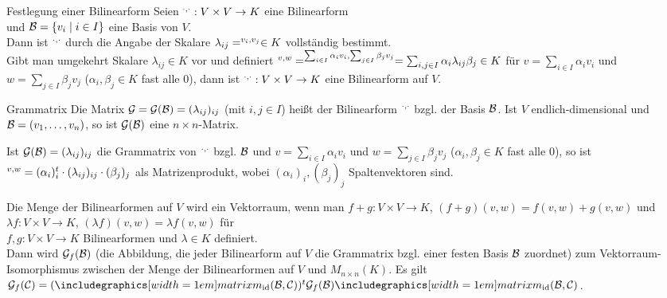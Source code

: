 \begin{Satz}{Festlegung einer Bilinearform}
    Seien $\sp{\cdot, \cdot}: V \times V \rightarrow K$ eine Bilinearform \\
    und $\mathcal{B} = \{v_i \;|\; i \in I\}$ eine Basis von $V$. \\
    Dann ist $\sp{\cdot, \cdot}$ durch die Angabe der Skalare
    $\lambda_{ij} = \sp{v_i, v_j} \in K$ vollständig bestimmt. \\
    Gibt man umgekehrt Skalare $\lambda_{ij} \in K$ vor und definiert
    $\sp{v, w} = \sp{\sum_{i \in I} \alpha_i v_i, \sum_{j \in I} \beta_j v_j}
    = \sum_{i, j \in I} \alpha_i \lambda_{ij} \beta_j \in K$
    für $v = \sum_{i \in I} \alpha_i v_i$ und
    $w = \sum_{j \in I} \beta_j v_j$ ($\alpha_i, \beta_j \in K$ fast alle $0$),
    dann ist $\sp{\cdot, \cdot}: V \times V \rightarrow K$ eine Bilinearform
    auf $V$.
\end{Satz}

\begin{Def}{Grammatrix}
    Die Matrix $\mathcal{G} = \mathcal{G}(\mathcal{B}) = (\lambda_{ij})_{ij}$
    (mit $i, j \in I$) heißt  der Bilinearform
    $\sp{\cdot, \cdot}$ bzgl. der Basis $\mathcal{B}$.
    Ist $V$ endlich-dimensional und $\mathcal{B} = (v_1, \ldots, v_n)$,
    so ist $\mathcal{G}(\mathcal{B})$ eine $n \times n$-Matrix.
\end{Def}

\begin{Bem}
    Ist $\mathcal{G}(\mathcal{B}) = (\lambda_{ij})_{ij}$ die Grammatrix
    von $\sp{\cdot, \cdot}$ bzgl. $\mathcal{B}$ und
    $v = \sum_{i \in I} \alpha_i v_i$ und $w = \sum_{j \in I} \beta_j v_j$
    ($\alpha_i, \beta_j \in K$ fast alle $0$), so ist
    $\sp{v, w} = (\alpha_i)_i^t \cdot (\lambda_{ij})_{ij} \cdot (\beta_j)_j$
    als Matrizenprodukt, wobei $(\alpha_i)_i, (\beta_j)_j$ Spaltenvektoren
    sind.
\end{Bem}

\begin{Bem}
    Die Menge der Bilinearformen auf $V$ wird ein Vektorraum, wenn
    man $f+g: V \times V \rightarrow K$, $(f+g)(v, w) = f(v, w) + g(v, w)$
    und $\lambda f: V \times V \rightarrow K$,
    $(\lambda f)(v, w) = \lambda f(v, w)$ für \\
    $f, g: V \times V \rightarrow K$
    Bilinearformen und $\lambda \in K$ definiert. \\
    Dann wird $\mathcal{G}_f(\mathcal{B})$ (die Abbildung, die jeder Bilinearform
    auf $V$ die Grammatrix bzgl. einer festen Basis $\mathcal{B}$ zuordnet)
    zum Vektorraum-Isomorphismus zwischen der Menge der Bilinearformen
    auf $V$ und $M_{n \times n}(K)$.
    Es gilt $\grammatrix_f(\basis{C}) = (\hommatrix{\id}{B}{C})^t
    \grammatrix_f(\basis{B}) \hommatrix{\id}{B}{C}$.
\end{Bem}

